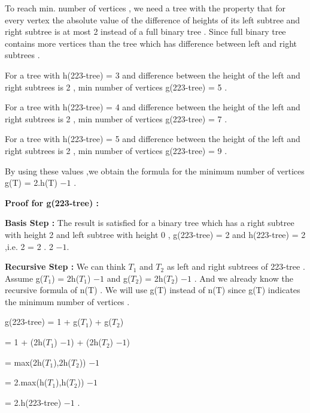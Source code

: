 \documentclass[12pt]{article}
\begin{document}
\hspace{15px}To reach min. number of vertices , we need a tree with the property that for every vertex the absolute value of the
difference of heights of its left subtree and right subtree is at most 2 instead of a full binary tree . Since full binary tree contains more vertices than the tree which has difference between left and right subtrees . \par 
For a tree with h(223-tree) = 3 and difference between the height of the left and right subtrees is 2 , min number of vertices g(223-tree) = 5 . \par 
For a tree with h(223-tree) = 4 and difference between the height of the left and right subtrees is 2 , min number of vertices g(223-tree) = 7 . \par 
For a tree with h(223-tree) = 5 and difference between the height of the left and right subtrees is 2 , min number of vertices g(223-tree) = 9 . \par 
By using these values ,we obtain the formula for the minimum number of vertices g(T) = 2.h(T) \textit{$- 1$} . \par 
\textbf{Proof for g(223-tree) :} \par 
\textbf{Basis Step :} The result is satisfied for a binary tree which has a right subtree with height 2 and left subtree with height 0 , g(223-tree) = 2 and h(223-tree) = 2 ,i.e. 2 = 2 . 2 \textit{$- 1$}.\par
\textbf{Recursive Step :} We can think \textit{$T_1$} and \textit{$T_2$} as left and right subtrees of 223-tree . Assume  g(\textit{$T_1$}) = 2h(\textit{$T_1$}) \textit{$- 1$} and g(\textit{$T_2$}) = 2h(\textit{$T_2$}) \textit{$- 1$} . And we already know the recursive formula of n(T) . We will use g(T) instead of n(T) since g(T) indicates the minimum number of vertices .\par 
g(223-tree) = 1 + g(\textit{$T_1$}) + g(\textit{$T_2$}) \par 
\hspace{55px} =  1 + (2h(\textit{$T_1$}) \textit{$- 1$}) + (2h(\textit{$T_2$}) \textit{$- 1$}) \par 
\hspace{55px} = max(2h(\textit{$T_1$}),2h(\textit{$T_2$})) \textit{$- 1$} \par 
\hspace{55px} = 2.max(h(\textit{$T_1$}),h(\textit{$T_2$})) \textit{$- 1$} \par 
\hspace{55px} = 2.h(223-tree) \textit{$- 1$} .
\end{document}
